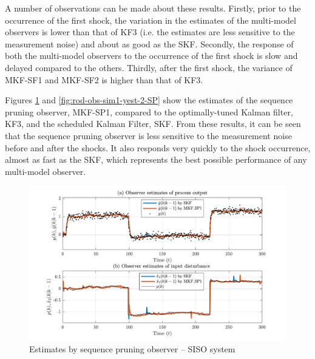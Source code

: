 A number of observations can be made about these results. Firstly, prior to the occurrence of the first shock, the variation in the estimates of the multi-model observers is lower than that of KF3 (i.e. the estimates are less sensitive to the measurement noise) and about as good as the SKF. Secondly, the response of both the multi-model observers to the occurrence of the first shock is slow and delayed compared to the others. Thirdly, after the first shock, the variance of MKF-SF1 and MKF-SF2 is higher than that of KF3.

Figures \ref{fig:rod-obs-sim1-yest-1-SP} and \ref{fig:rod-obs-sim1-yest-2-SP} show the estimates of the sequence pruning observer, MKF-SP1, compared to the optimally-tuned Kalman filter, KF3, and the scheduled Kalman Filter, SKF.  From these results, it can be seen that the sequence pruning observer is less sensitive to the measurement noise before and after the shocks. It also responds very quickly to the shock occurrence, almost as fast as the SKF, which represents the best possible performance of any multi-model observer.
\begin{figure}[htp]
	\centering
	\includegraphics[width=13cm]{images/rod_obs_sim1_all_seed_y_est1_SP1.pdf}
	\caption{Estimates by sequence pruning observer – SISO system}
	\label{fig:rod-obs-sim1-yest-1-SP}
\end{figure}

